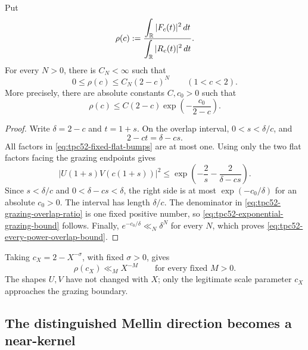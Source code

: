 \begin{proposition}
\label{prop:tpc52-every-power-grazing}
Put
\begin{equation}
 \rho(c):=
 \frac{\displaystyle\int_\mathbb R|F_c(t)|^2\,dt}
      {\displaystyle\int_\mathbb R|R_c(t)|^2\,dt}.
 \label{eq:tpc52-grazing-overlap-ratio}
\end{equation}
For every \(N>0\), there is \(C_N<\infty\) such that
\begin{equation}
 0\leq\rho(c)\leq C_N(2-c)^N
 \qquad(1<c<2).
 \label{eq:tpc52-every-power-overlap-bound}
\end{equation}
More precisely, there are absolute constants \(C,c_0>0\) such that
\begin{equation}
 \rho(c)\leq C(2-c)\exp\!\left(-\frac{c_0}{2-c}\right).
 \label{eq:tpc52-exponential-grazing-bound}
\end{equation}
\end{proposition}

\begin{proof}
Write \(\delta=2-c\) and \(t=1+s\).  On the overlap interval,
\(0<s<\delta/c\), and
\begin{equation}
 2-ct=\delta-cs.
 \label{eq:tpc52-two-flat-distances}
\end{equation}
All factors in \eqref{eq:tpc52-fixed-flat-bumps} are at most one.
Using only the two flat factors facing the grazing endpoints gives
\[
 |U(1+s)V(c(1+s))|^2
 \leq
 \exp\!\left(-\frac2s-\frac2{\delta-cs}\right).
\]
Since \(s<\delta/c\) and \(0<\delta-cs<\delta\), the right side is at
most \(\exp(-c_0/\delta)\) for an absolute \(c_0>0\).  The interval has
length \(\delta/c\).  The denominator in
\eqref{eq:tpc52-grazing-overlap-ratio} is one fixed positive number, so
\eqref{eq:tpc52-exponential-grazing-bound} follows.  Finally,
\(e^{-c_0/\delta}\ll_N\delta^N\) for every \(N\), which proves
\eqref{eq:tpc52-every-power-overlap-bound}.
\end{proof}

Taking \(c_X=2-X^{-\sigma}\), with fixed \(\sigma>0\), gives
\begin{equation}
 \rho(c_X)\ll_M X^{-M}
 \qquad\text{for every fixed }M>0.
 \label{eq:tpc52-superpolynomial-overlap-collapse}
\end{equation}
The shapes \(U,V\) have not changed with \(X\); only the legitimate
scale parameter \(c_X\) approaches the grazing boundary.

\subsection{The distinguished Mellin direction becomes a near-kernel}

